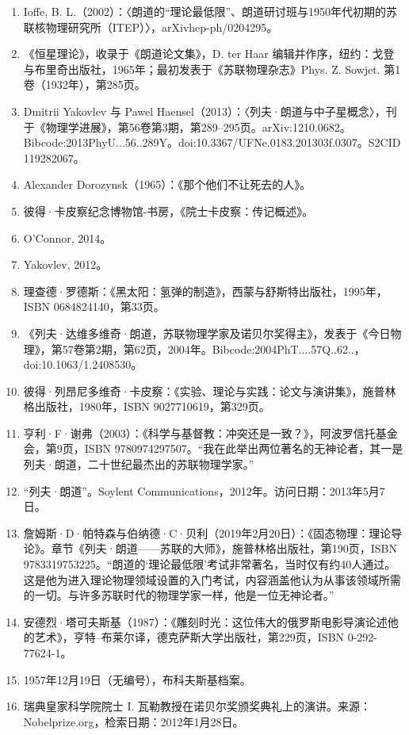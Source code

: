 \begin{enumerate}
\item Ioffe, B. L.（2002）：〈朗道的“理论最低限”、朗道研讨班与1950年代初期的苏联核物理研究所（ITEP）〉，arXiv\:hep-ph/0204295。
\item 《恒星理论》，收录于《朗道论文集》，D. ter Haar 编辑并作序，纽约：戈登与布里奇出版社，1965年；最初发表于《苏联物理杂志》Phys. Z. Sowjet. 第1卷（1932年），第285页。
\item Dmitrii Yakovlev 与 Pawel Haensel（2013）：〈列夫·朗道与中子星概念〉，刊于《物理学进展》，第56卷第3期，第289–295页。arXiv:1210.0682。Bibcode:2013PhyU...56..289Y。doi:10.3367/UFNe.0183.201303f.0307。S2CID 119282067。
\item Alexander Dorozynsk（1965）：《那个他们不让死去的人》。
\item 彼得·卡皮察纪念博物馆-书房，《院士卡皮察：传记概述》。
\item O'Connor, 2014。
\item Yakovlev, 2012。
\item 理查德·罗德斯：《黑太阳：氢弹的制造》，西蒙与舒斯特出版社，1995年，ISBN 0684824140，第33页。
\item 《列夫·达维多维奇·朗道，苏联物理学家及诺贝尔奖得主》，发表于《今日物理》，第57卷第2期，第62页，2004年。Bibcode:2004PhT....57Q..62..，doi:10.1063/1.2408530。
\item 彼得·列昂尼多维奇·卡皮察：《实验、理论与实践：论文与演讲集》，施普林格出版社，1980年，ISBN 9027710619，第329页。
\item 亨利·F·谢弗（2003）：《科学与基督教：冲突还是一致？》，阿波罗信托基金会，第9页，ISBN 9780974297507。“我在此举出两位著名的无神论者，其一是列夫·朗道，二十世纪最杰出的苏联物理学家。”
\item “列夫·朗道”。Soylent Communications，2012年。访问日期：2013年5月7日。
\item 詹姆斯·D·帕特森与伯纳德·C·贝利（2019年2月20日）：《固态物理：理论导论》。章节《列夫·朗道——苏联的大师》，施普林格出版社，第190页，ISBN 9783319753225。“朗道的‘理论最低限’考试非常著名，当时仅有约40人通过。这是他为进入理论物理领域设置的入门考试，内容涵盖他认为从事该领域所需的一切。与许多苏联时代的物理学家一样，他是一位无神论者。”
\item 安德烈·塔可夫斯基（1987）：《雕刻时光：这位伟大的俄罗斯电影导演论述他的艺术》，亨特–布莱尔译，德克萨斯大学出版社，第229页，ISBN 0-292-77624-1。
\item 1957年12月19日（无编号），布科夫斯基档案。
\item 瑞典皇家科学院院士 I. 瓦勒教授在诺贝尔奖颁奖典礼上的演讲。来源：Nobelprize.org，检索日期：2012年1月28日。

\end{enumerate}
